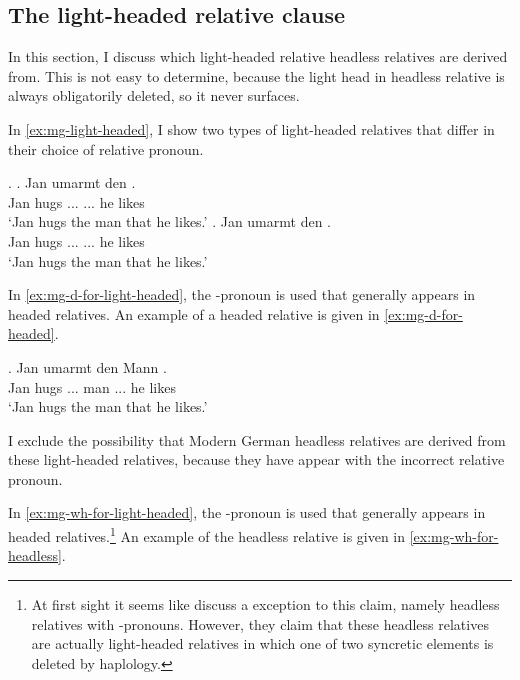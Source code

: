 \subsection{The light-headed relative clause}

In this section, I discuss which light-headed relative headless relatives are derived from. This is not easy to determine, because the light head in headless relative is always obligatorily deleted, so it never surfaces.

In \ref{ex:mg-light-headed}, I show two types of light-headed relatives that differ in their choice of relative pronoun.

\ex.\label{ex:mg-light-headed}
\ag. Jan umarmt den   .\\
Jan hugs ... ... he likes\\
`Jan hugs the man that he likes.'\label{ex:mg-d-for-light-headed}
\bg. Jan umarmt den   .\\
Jan hugs ... ... he likes\\
`Jan hugs the man that he likes.'\label{ex:mg-wh-for-light-headed}

In \ref{ex:mg-d-for-light-headed}, the -pronoun is used that generally appears in headed relatives. An example of a headed relative is given in \ref{ex:mg-d-for-headed}.

\exg. Jan umarmt den Mann   .\\
Jan hugs ... man ... he likes\\
`Jan hugs the man that he likes.'\label{ex:mg-d-for-headed}

I exclude the possibility that Modern German headless relatives are derived from these light-headed relatives, because they have appear with the incorrect relative pronoun.

In \ref{ex:mg-wh-for-light-headed}, the -pronoun is used that generally appears in headed relatives.\footnote{
At first sight it seems like \citet{fuss2014} discuss a exception to this claim, namely headless relatives with -pronouns. However, they claim that these headless relatives are actually light-headed relatives in which one of two syncretic elements is deleted by haplology.
}
An example of the headless relative is given in \ref{ex:mg-wh-for-headless}.


